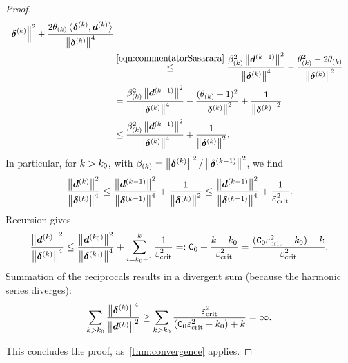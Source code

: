 \documentclass{article}
\theoremstyle{plain}
\theoremstyle{definition}
\begin{document}
\begin{proof}
\begin{align}
{			\left\|\bm{\delta}^{(k)}\right\|^2
		}
		+ 
		\frac{
			2\theta_{(k)}\left\langle \bm{\delta}^{(k)}, \bm{d}^{(k)} \right\rangle
		}{
			\left\|\bm{\delta}^{(k)}\right\|^4
		}
		\nonumber
		\\
		&\stackrel{\eqref{eqn:commentatorSasarara}}\leq
		\frac{
			\beta_{(k)}^2\left\|\bm{d}^{(k-1)}\right\|^2
		}{
			\left\|\bm{\delta}^{(k)}\right\|^4
		}
		-
		\frac{
			\theta_{(k)}^2 - 2 \theta_{(k)}
		}{
			\left\|\bm{\delta}^{(k)}\right\|^2
		}
		\nonumber
		\\
		&=
		\frac{
			\beta_{(k)}^2\left\|\bm{d}^{(k-1)}\right\|^2
		}{
			\left\|\bm{\delta}^{(k)}\right\|^4
		}
		-
		\frac{
			(\theta_{(k)} -1)^2
		}{
			\left\|\bm{\delta}^{(k)}\right\|^2
		}
		+
		\frac{1}{\left\|\bm{\delta}^{(k)}\right\|^2}
		\nonumber
		\\
		&\leq
		\frac{
			\beta_{(k)}^2\left\|\bm{d}^{(k-1)}\right\|^2
		}{
			\left\|\bm{\delta}^{(k)}\right\|^4
		}
		+
		\frac{1}{\left\|\bm{\delta}^{(k)}\right\|^2}.
		\label{eqn:recalcitratedLinearly}
	\end{align}
	In particular, for $k > k_0$, with
	$\beta_{(k)} = \left\|\bm{\delta}^{(k)}\right\|^2 / \left\|\bm{\delta}^{(k-1)}\right\|^2$,
	we find
	$$
	\frac{\left\|\bm{d}^{(k)}\right\|^2}{\left\|\bm{\delta}^{(k)}\right\|^4}
	\leq
	\frac{\left\|\bm{d}^{(k-1)}\right\|^2}{\left\|\bm{\delta}^{(k-1)}\right\|^4}
	+ \frac{1}{\left\|\bm{\delta}^{(k)}\right\|^2}
	\leq
	\frac{\left\|\bm{d}^{(k-1)}\right\|^2}{\left\|\bm{\delta}^{(k-1)}\right\|^4}
	+ \frac{1}{\varepsilon_{\mathrm{crit}}^2}.
	$$
	Recursion gives
	$$
	\frac{\left\|\bm{d}^{(k)}\right\|^2}{\left\|\bm{\delta}^{(k)}\right\|^4}
	\leq
	\frac{\left\|\bm{d}^{(k_0)}\right\|^2}{\left\|\bm{\delta}^{(k_0)}\right\|^4}
	+
	\sum_{i=k_0 + 1}^k
	\frac{1}{\varepsilon_{\mathrm{crit}}^2}
	=:
	\mathtt C_0
	+
	\frac{k - k_0}{\varepsilon_{\mathrm{crit}}^2}
	=
	\frac{(\mathtt C_0 \varepsilon_{\mathrm{crit}}^2 - k_0) + k}{\varepsilon_{\mathrm{crit}}^2}.
	$$
	Summation of the reciprocals results in a 
	divergent sum (because the harmonic series diverges):
	$$
	\sum_{k>k_0}
	\frac{\left\|\bm{\delta}^{(k)}\right\|^4}{\left\|\bm{d}^{(k)}\right\|^2}
	\geq 
	\sum_{k>k_0}
	\frac{
		\varepsilon_{\mathrm{crit}}^2
		}{
		(\mathtt C_0 \varepsilon_{\mathrm{crit}}^2 - k_0) + k
	}
	= \infty.
	$$

	This concludes the proof, as~\cref{thm:convergence} applies.
\end{proof}
\end{document}
